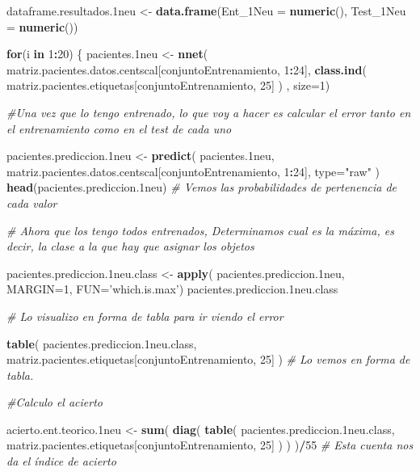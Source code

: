 \documentclass[]{article}
\newenvironment{Shaded}{\begin{snugshade}}{\end{snugshade}}
\newcommand{\KeywordTok}[1]{\textcolor[rgb]{0.13,0.29,0.53}{\textbf{#1}}}
\newcommand{\DataTypeTok}[1]{\textcolor[rgb]{0.13,0.29,0.53}{#1}}
\newcommand{\DecValTok}[1]{\textcolor[rgb]{0.00,0.00,0.81}{#1}}
\newcommand{\StringTok}[1]{\textcolor[rgb]{0.31,0.60,0.02}{#1}}
\newcommand{\CommentTok}[1]{\textcolor[rgb]{0.56,0.35,0.01}{\textit{#1}}}
\newcommand{\ControlFlowTok}[1]{\textcolor[rgb]{0.13,0.29,0.53}{\textbf{#1}}}
\newcommand{\OperatorTok}[1]{\textcolor[rgb]{0.81,0.36,0.00}{\textbf{#1}}}
\newcommand{\NormalTok}[1]{#1}
\begin{document}
\begin{Shaded}
\begin{Highlighting}[]
\NormalTok{dataframe.resultados.1neu <-}\StringTok{ }\KeywordTok{data.frame}\NormalTok{(}\DataTypeTok{Ent_1Neu =} \KeywordTok{numeric}\NormalTok{(),}
                                        \DataTypeTok{Test_1Neu =} \KeywordTok{numeric}\NormalTok{())}

\ControlFlowTok{for}\NormalTok{(i }\ControlFlowTok{in} \DecValTok{1}\OperatorTok{:}\DecValTok{20}\NormalTok{)}
\NormalTok{\{}
\NormalTok{  pacientes.1neu <-}\StringTok{ }\KeywordTok{nnet}\NormalTok{( matriz.pacientes.datos.centscal[conjuntoEntrenamiento, }\DecValTok{1}\OperatorTok{:}\DecValTok{24}\NormalTok{], }\KeywordTok{class.ind}\NormalTok{( matriz.pacientes.etiquetas[conjuntoEntrenamiento, }\DecValTok{25}\NormalTok{] ) , }\DataTypeTok{size=}\DecValTok{1}\NormalTok{)}

  \CommentTok{#Una vez que lo tengo entrenado, lo que voy a hacer es calcular el error tanto en el entrenamiento como en el test de cada uno}
  
\NormalTok{  pacientes.prediccion.1neu <-}\StringTok{ }\KeywordTok{predict}\NormalTok{( pacientes.1neu, matriz.pacientes.datos.centscal[conjuntoEntrenamiento, }\DecValTok{1}\OperatorTok{:}\DecValTok{24}\NormalTok{], }\DataTypeTok{type=}\StringTok{"raw"}\NormalTok{ )}
  \KeywordTok{head}\NormalTok{(pacientes.prediccion.1neu) }\CommentTok{# Vemos las probabilidades de pertenencia de cada valor}
  
  \CommentTok{# Ahora que los tengo todos entrenados, Determinamos cual es la máxima, es decir, la clase a la que hay que asignar los objetos}
  
\NormalTok{  pacientes.prediccion.1neu.class <-}\StringTok{ }\KeywordTok{apply}\NormalTok{( pacientes.prediccion.1neu, }\DataTypeTok{MARGIN=}\DecValTok{1}\NormalTok{, }\DataTypeTok{FUN=}\StringTok{'which.is.max'}\NormalTok{)}
\NormalTok{  pacientes.prediccion.1neu.class}
  
  \CommentTok{# Lo visualizo en forma de tabla para ir viendo el error}
  
  \KeywordTok{table}\NormalTok{( pacientes.prediccion.1neu.class, matriz.pacientes.etiquetas[conjuntoEntrenamiento, }\DecValTok{25}\NormalTok{] )  }\CommentTok{# Lo vemos en forma de tabla.}
  
  \CommentTok{#Calculo el acierto}
  
\NormalTok{  acierto.ent.teorico.1neu <-}\StringTok{ }\KeywordTok{sum}\NormalTok{( }\KeywordTok{diag}\NormalTok{( }\KeywordTok{table}\NormalTok{( pacientes.prediccion.1neu.class, matriz.pacientes.etiquetas[conjuntoEntrenamiento, }\DecValTok{25}\NormalTok{] ) ) )}\OperatorTok{/}\DecValTok{55} \CommentTok{# Esta cuenta nos da el índice de acierto}
  

\end{Highlighting}
\end{Shaded}
\end{document}
